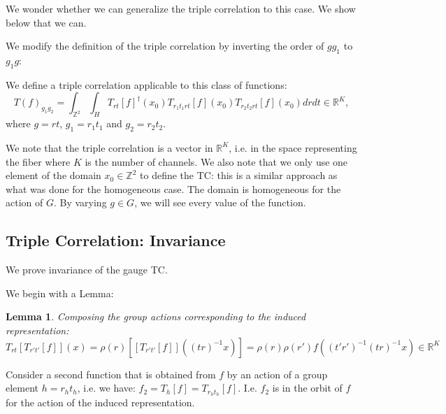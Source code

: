 \documentclass{article}
\newtheorem{lemma}{Lemma}
\begin{document}
We wonder whether we can generalize the triple correlation to this case. We show below that we can.

We modify the definition of the triple correlation by inverting the order of $gg_1$ to $g_1g$:


We define a triple correlation applicable to this class of functions:
\begin{equation}
    T(f)_{g_1g_2}
        = \int_{\mathbb{Z}^2}
            \int_H
                T_{rt}[f]^\dagger (x_0) T_{r_1t_1rt}[f](x_0) T_{r_2t_2rt}[f](x_0)
                    drdt \in \mathbb{R}^K,
\end{equation}
where $g = rt$, $g_1 = r_1t_1$ and $g_2 = r_2 t_2$.

We note that the triple correlation is a vector in $\mathbb{R}^K$, i.e. in the space representing the fiber where $K$ is the number of channels. We also note that we only use one element of the domain $x_0 \in \mathbb{Z}^2$ to define the TC: this is a similar approach as what was done for the homogeneous case. The domain is homogeneous for the action of $G$. By varying $g \in G$, we will see every value of the function.

\subsection{Triple Correlation: Invariance}

We prove invariance of the gauge TC.

We begin with a Lemma:

\begin{lemma}
Composing the group actions corresponding to the induced representation:
    \begin{equation}
    T_{rt}[T_{r't'}[f]] (x)
        = \rho(r) \left[[T_{r't'}[f]]\left((t r)^{-1} x\right)\right]
        = \rho(r)  \rho(r') f((t'r')^{-1}(tr)^{-1}x) \in \mathbb{R}^K
\end{equation}
\end{lemma}


Consider a second function that is obtained from $f$ by an action of a group element $h = r_ht_h$, i.e. we have: $f_2 = T_h[f] = T_{r_ht_h}[f]$. I.e. $f_2$ is in the orbit of $f$ for the action of the induced representation.
\end{document}
